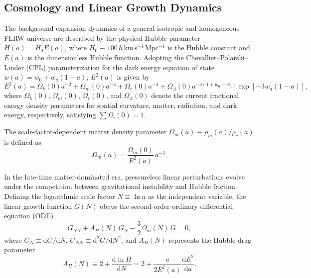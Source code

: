 \subsection{Cosmology and Linear Growth Dynamics}
\label{subsec:cosmology_linear_growth}

The background expansion dynamics of a general isotropic and homogeneous FLRW universe are described by the physical Hubble parameter $H(a) = H_0 E(a)$, where $H_0 \equiv 100\,h\,\mathrm{km\,s^{-1}\, Mpc^{-1}}$ is the Hubble constant and $E(a)$ is the dimensionless Hubble function. 
Adopting the Chevallier--Polarski--Linder (CPL) parameterization for the dark energy equation of state $w(a) = w_0 + w_a(1-a)$, $E^2(a)$ is given by
    \begin{equation}
        E^2(a) 
        = \Omega_k(0)a^{-2} 
        + \Omega_m(0)a^{-3} 
        + \Omega_r(0)a^{-4} 
        + \Omega_\Lambda(0)a^{-3(1+w_0+w_a)} \exp\left[-3w_a(1-a)\right],
        \label{eq:dimensionless_hubble}
    \end{equation}
where $\Omega_k(0)$, $\Omega_m(0)$, $\Omega_r(0)$, and $\Omega_\Lambda(0)$ denote the current fractional energy density parameters for spatial curvature, matter, radiation, and dark energy, respectively, satisfying $\sum \Omega_i(0) = 1$.

The scale-factor-dependent matter density parameter $\Omega_m(a) \equiv \rho_m(a)/\rho_c(a)$ is defined as
    \begin{equation}
        \Omega_m(a) 
        = \frac{\Omega_m(0)}{E^2(a)}\, a^{-3}.
        \label{eq:omega_m_a}
    \end{equation}
    
In the late-time matter-dominated era, pressureless linear perturbations evolve under the competition between gravitational instability and Hubble friction. 
Defining the logarithmic scale factor $N \equiv \ln a$ as the independent variable, the linear growth function $G(N)$ obeys the second-order ordinary differential equation (ODE)
    \begin{equation}
        G_{NN} + A_H(N)\, G_N - \frac{3}{2}\Omega_m(N)\, G 
        = 0,
        \label{eq:linear_growth_N}
    \end{equation}
where $G_N \equiv \mathrm{d}G/\mathrm{d}N$, $G_{NN} \equiv \mathrm{d}^2G/\mathrm{d}N^2$, and $A_H(N)$ represents the Hubble drag parameter
    \begin{equation}
        A_H(N) 
        \equiv 2 + \frac{\mathrm{d}\ln H}{\mathrm{d}N} 
        = 2 + \frac{a}{2 E^2(a)} \frac{\mathrm{d}E^2}{\mathrm{d}a}.
        \label{eq:expansion_decay}
    \end{equation}

